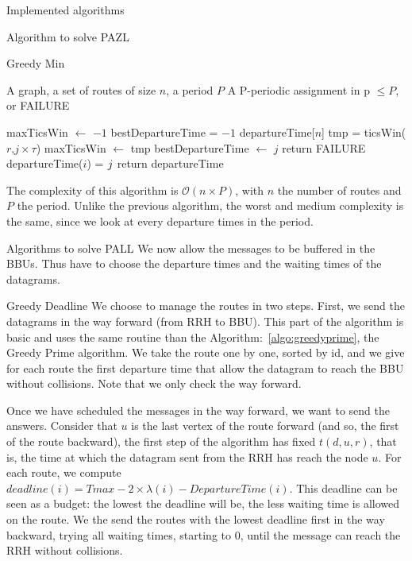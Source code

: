 \documentclass[10pt]{article}
\begin{document}
\begin{section}{Implemented algorithms}
\begin{subsection}{Algorithm to solve PAZL }
\begin{subsubsection}{Greedy Min}
	
   	\begin{algorithm}[H]
 	\caption{Greedy tics won}
 	\begin{algorithmic}
 	\REQUIRE A graph, a set of routes of size $n$, a period $P$
	\ENSURE A P-periodic assignment in p $\leq P$, or FAILURE

 	\FORALL{routes $i \in [0;n[$ }
	\STATE maxTicsWin $\leftarrow$ $-1$
	\STATE bestDepartureTime = $-1$
	\STATE departureTime[$n$]
	\FORALL{ offset $j \in [0;P[$ }
	\STATE tmp = ticsWin($r$,$j\times\tau$)
	\STATE maxTicsWin  $\leftarrow$ tmp
	\STATE bestDepartureTime  $\leftarrow$ $j$
	\ENDIF
 	\ENDFOR
	\STATE return FAILURE
	\ENDIF
	\STATE departureTime($i$) = $j\time\tau$
 	\ENDFOR
	\STATE return departureTime

 	\end{algorithmic}
 	\end{algorithm}
	
	The complexity of this algorithm is $\mathcal{O}(n\times P)$, with $n$ the number of routes and $P$ the period. Unlike the previous algorithm, the worst and medium complexity is the same, since we look at every departure times in the period.
\end{subsubsection}
  \end{subsection}
    \begin{subsection}{Algorithms to solve PALL}
     We now allow the messages to be buffered in the BBUs. Thus have to choose the departure times and the waiting times of the datagrams.     
      \begin{subsubsection}{Greedy Deadline}
      We choose to manage the routes in two steps.
      First, we send the datagrams in the way forward (from RRH to BBU).
      This part of the algorithm is basic and uses the same routine than the Algorithm:~\ref{algo:greedyprime}, the Greedy Prime algorithm. We take the route one by one, sorted by id, and we give for each route the first departure time that allow the datagram to reach the BBU without collisions. Note that we only check the way forward.
      
      Once we have scheduled the messages in the way forward, we want to send the answers. Consider that $u$ is the last vertex of the route forward (and so, the first of the route backward), the first step of the algorithm has fixed $t(d,u,r)$, that is, the time at which the datagram sent from the RRH has reach the node $u$. For each route, we compute $deadline(i) = Tmax - 2\times\lambda(i) - DepartureTime(i)$. This deadline can be seen as a budget: the lowest the deadline will be, the less waiting time is allowed on the route.\newline
      We the send the routes with the lowest deadline first in the way backward, trying all waiting times, starting to $0$, until the message can reach the RRH without collisions.
            

\end{subsubsection}
\end{subsection}
\end{section}
\end{document}
